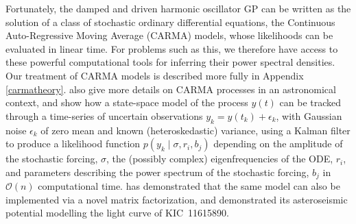 \documentclass[modern]{aastex61}
\begin{document}
Fortunately, the damped and driven harmonic oscillator GP can be written as the
solution of a class of stochastic ordinary differential equations, the
Continuous Auto-Regressive Moving Average (CARMA) models, whose likelihoods can
be evaluated in linear time. For problems such as this, we therefore have access
to these powerful computational tools for inferring their power spectral
densities.  Our treatment of CARMA models is described more fully in Appendix
\ref{carmatheory}.   \citet{Kelly2014} also give more details on CARMA
processes in an astronomical context, and show how a state-space model of the
process $y(t)$ can be tracked through a time-series of uncertain observations
$y_k = y\left( t_k \right) + \epsilon_k$, with Gaussian noise $\epsilon_k$ of
zero mean and known (heteroskedastic) variance, using a Kalman filter to produce
a likelihood function $p\left( y_k \mid \sigma, r_i, b_j \right)$ depending on
the amplitude of the stochastic forcing, $\sigma$, the (possibly complex)
eigenfrequencies of the ODE, $r_i$, and parameters describing the power spectrum
of the stochastic forcing, $b_j$ in $\mathcal{O}\left( n \right)$ computational
time. \citet{Foreman-Mackey2017} has demonstrated that the same model can also be implemented via a novel matrix factorization, and demonstrated its asteroseismic potential modelling the light curve of KIC~11615890.
\end{document}
